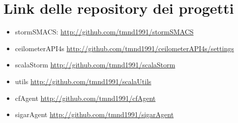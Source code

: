 \documentclass[12pt]{article}
\begin{document}
\section{Link delle repository dei progetti}
\begin{itemize}
\item stormSMACS: \url{http://github.com/tmnd1991/stormSMACS}
\item ceilometerAPI4s \url{http://github.com/tmnd1991/ceilometerAPI4s/settings}
\item scalaStorm \url{http://github.com/tmnd1991/scalaStorm}
\item utils \url{http://github.com/tmnd1991/scalaUtils}
\item cfAgent \url{http://github.com/tmnd1991/cfAgent}
\item sigarAgent \url{http://github.com/tmnd1991/sigarAgent}
\end{itemize}


\end{document}
